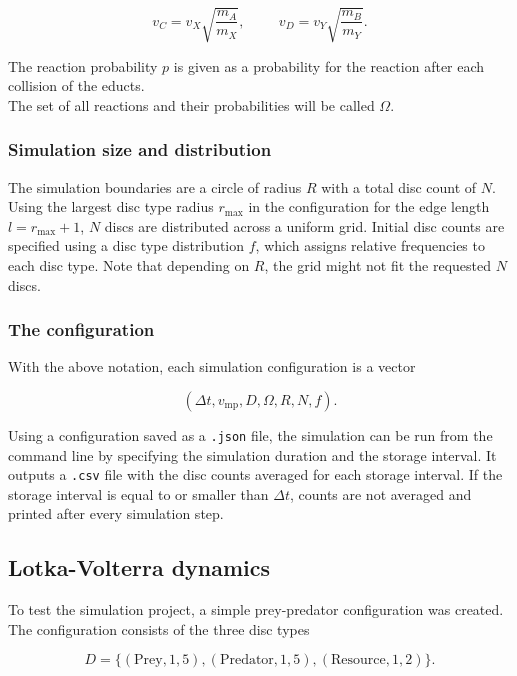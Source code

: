 \documentclass[a4paper]{scrartcl}
\begin{document}
\begin{equation*}
    v_C = v_X\sqrt{\frac{m_A}{m_X}},\hspace{1cm} v_D = v_Y\sqrt{\frac{m_B}{m_Y}}.
\end{equation*}

The reaction probability $p$ is given as a probability for the reaction after each collision of the educts.\\
The set of all reactions and their probabilities will be called $\Omega$.

\subsubsection*{Simulation size and distribution}
The simulation boundaries are a circle of radius $R$ with a total disc count of $N$. Using the largest disc type radius $r_{\text{max}}$ in the configuration for the edge length $l = r_{\text{max}} + 1$, $N$ discs are distributed across a uniform grid. Initial disc counts are specified using a disc type distribution $f$, which assigns relative frequencies to each disc type. Note that depending on $R$, the grid might not fit the requested $N$ discs.

\subsubsection*{The configuration}
With the above notation, each simulation configuration is a vector

\begin{equation*}
    (\Delta t, v_{\text{mp}}, D, \Omega, R, N, f).
\end{equation*}

Using a configuration saved as a \texttt{.json} file, the simulation can be run from the command line by specifying the simulation duration and the storage interval. It outputs a \texttt{.csv} file with the disc counts averaged for each storage interval. If the storage interval is equal to or smaller than $\Delta t$, counts are not averaged and printed after every simulation step.

\subsection{Lotka-Volterra dynamics}
\label{subsection_lv_dynamics_intro}
To test the simulation project, a simple prey-predator configuration was created. The configuration consists of the three disc types

\begin{equation*}
    D = \{(\text{Prey}, 1, 5), (\text{Predator}, 1, 5), (\text{Resource}, 1, 2)\}.
\end{equation*}
\end{document}

